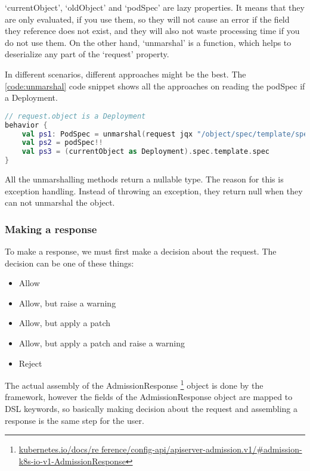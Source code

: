 `currentObject', `oldObject' and `podSpec' are lazy properties. It means that they are only evaluated, if you use them, so they will not cause an error if the field they reference does not exist, and they will also not waste processing time if you do not use them. On the other hand, `unmarshal' is a function, which helps to deserialize any part of the `request' property.

In different scenarios, different approaches might be the best. The \ref{code:unmarshal} code snippet shows all the approaches on reading the podSpec if a Deployment.

\begin{lstlisting}[caption={Unmarshalling},language=Kotlin,label=code:unmarshal]
// request.object is a Deployment
behavior {
    val ps1: PodSpec = unmarshal(request jqx "/object/spec/template/spec")!!
    val ps2 = podSpec!!
    val ps3 = (currentObject as Deployment).spec.template.spec
}
\end{lstlisting}

All the unmarshalling methods return a nullable type. The reason for this is exception handling. Instead of throwing an exception, they return null when they can not unmarshal the object.

\subsubsection{Making a response}

To make a response, we must first make a decision about the request. The decision can be one of these things:

\begin{itemize}
    \item Allow
    \item Allow, but raise a warning
    \item Allow, but apply a patch
    \item Allow, but apply a patch and raise a warning
    \item Reject
\end{itemize}

The actual assembly of the AdmissionResponse
\footnote{\url{kubernetes.io/docs/re  ference/config-api/apiserver-admission.v1/\#admission-k8s-io-v1-AdmissionResponse}}
object is done by the framework, however the fields of the AdmissionResponse object are mapped to DSL keywords, so basically making decision about the request and assembling a response is the same step for the user. 

